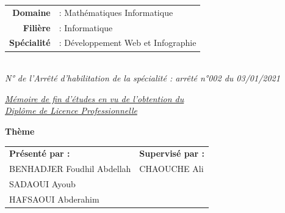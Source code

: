 \documentclass[12pt,a4paper]{report}
\begin{document}
\begin{titlepage}
\begin{center}
    \begin{tabular}{rl}
        \textbf{Domaine} & : Mathématiques Informatique \\
        \textbf{Filière} & : Informatique \\
        \textbf{Spécialité} & : Développement Web et Infographie \\
    \end{tabular} \\
    
    {\small \textit{N° de l'Arrêté d'habilitation de la spécialité : arrêté n°002 du 03/01/2021}} \\
    \vspace{0.7cm}
    
    {\large \textit{\underline{Mémoire de fin d'études en vu de l'obtention du}}} \\
    {\large \textit{\underline{Diplôme de Licence Professionnelle}}} \\
    \vspace{0.7cm}
    
    {\LARGE \textbf{Thème}} \\
    \vspace{0.6cm}
    
    \vspace{0.8cm}

    \begin{tabular}{p{8cm}p{6cm}}
        \textbf{Présenté par :} & \textbf{Supervisé par :} \\
        BENHADJER Foudhil Abdellah & CHAOUCHE Ali \\
        SADAOUI Ayoub & \\
        HAFSAOUI Abderahim & \\
    \end{tabular} \\
    \vspace{0.8cm}
    

\end{center}
\end{titlepage}
\end{document}
